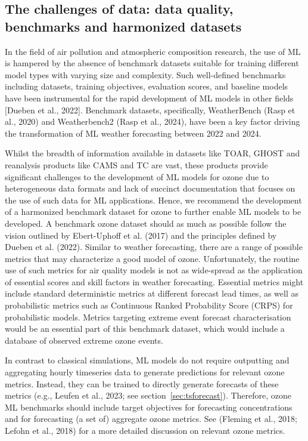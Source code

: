 \documentclass[gmd, manuscript]{copernicus}
\begin{document}
\subsection{The challenges of data: data quality, benchmarks and harmonized datasets}
In the field of air pollution and atmospheric composition research, the use of ML is hampered by the absence of benchmark datasets suitable for training different model types with varying size and complexity. Such well-defined benchmarks including datasets, training objectives, evaluation scores, and baseline models have been instrumental for the rapid development of ML models in other fields  [Dueben et al., 2022]. Benchmark datasets,  specifically,  WeatherBench (Rasp et al., 2020) and Weatherbench2 (Rasp et al., 2024), have been a key factor driving the transformation of ML  weather forecasting between 2022 and 2024. 

Whilst the breadth of information available in datasets like TOAR, GHOST and reanalysis products like CAMS and TC are vast, these products provide significant challenges to the development of ML models for ozone due to heterogeneous data formats and lack of succinct documentation that focuses on the use of such data for ML applications. Hence, we recommend the development of a harmonized benchmark dataset for ozone to further enable ML models to be developed. A benchmark ozone dataset should as much as possible follow the vision outlined by Ebert-Uphoff et al. (2017) and the principles defined by Dueben et al. (2022). Similar to weather forecasting, there are a range of possible metrics that may characterize a good model of ozone. Unfortunately, the routine use of such metrics for air quality models is not as wide-spread as  the application of essential scores and skill factors in weather forecasting. Essential metrics might include standard deterministic metrics at different forecast lead times, as well as probabilistic metrics such as Continuous Ranked Probability Score (CRPS) for probabilistic models. Metrics targeting extreme event forecast characterisation would be an essential part of this benchmark dataset, which would include a database of observed extreme ozone events. 

In contrast to classical simulations, ML models do not require outputting and aggregating hourly timeseries data to generate predictions for relevant ozone metrics. Instead, they can be trained to directly generate forecasts of these metrics (e.g., Leufen et al., 2023; see section~\ref{sec:tsforecast}). Therefore, ozone ML benchmarks should include target objectives for forecasting concentrations and for forecasting (a set of) aggregate ozone metrics. See (Fleming et al., 2018; Lefohn et al., 2018) for a more detailed discussion on relevant ozone metrics. 
\end{document}
